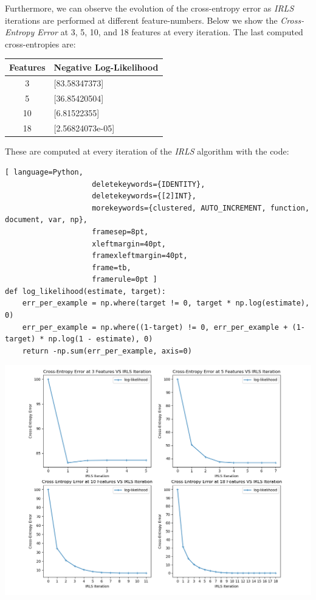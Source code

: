 \documentclass[a4paper,11pt,oneside]{article}
\begin{document}
Furthermore, we can observe the evolution of the cross-entropy error as \textit{IRLS} iterations are performed at different feature-numbers. Below we show the \textit{Cross-Entropy Error} at 3, 5, 10, and 18 features at every iteration. The last computed cross-entropies are:

\begin{tabular}{c|l}
Features	&	Negative Log-Likelihood\\\hline
3	&	[83.58347373] \\
5	&	[36.85420504] \\
10	&	[6.81522355] \\
18	&	[2.56824073e-05]
\end{tabular}

These are computed at every iteration of the \textit{IRLS} algorithm with the code:
\begin{lstlisting}[ language=Python,
                    deletekeywords={IDENTITY},
                    deletekeywords={[2]INT},
                    morekeywords={clustered, AUTO_INCREMENT, function, document, var, np},
                    framesep=8pt,
                    xleftmargin=40pt,
                    framexleftmargin=40pt,
                    frame=tb,
                    framerule=0pt ]
def log_likelihood(estimate, target):
    err_per_example = np.where(target != 0, target * np.log(estimate), 0)
    err_per_example = np.where((1-target) != 0, err_per_example + (1-target) * np.log(1 - estimate), 0)
    return -np.sum(err_per_example, axis=0)
\end{lstlisting}
\hspace*{-2cm}\includegraphics[scale=0.6]{irls_cee.png}
\end{document}
